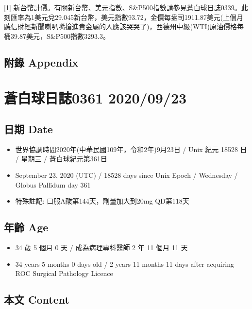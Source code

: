 \documentclass[
]{article}
\providecommand{\tightlist}{%
  \setlength{\itemsep}{0pt}\setlength{\parskip}{0pt}}
\begin{document}
{[}1{]}
新台幣計價。有關新台幣、美元指數、S\&P500指數請參見蒼白球日誌0339。此刻匯率為1美元兌29.045新台幣，美元指數93.72，金價每盎司1911.87美元(上個月聽信財經新聞喇叭嘴搶進貴金屬的人應該哭哭了)，西德州中級(WTI)原油價格每桶39.87美元，S\&P500指數3293.3。

\hypertarget{ux9644ux9304-appendix-21}{%
\subsection{附錄 Appendix}\label{ux9644ux9304-appendix-21}}

\hypertarget{ux84bcux767dux7403ux65e5ux8a8c0361-20200923}{%
\section{蒼白球日誌0361
2020/09/23}\label{ux84bcux767dux7403ux65e5ux8a8c0361-20200923}}

\hypertarget{ux65e5ux671f-date-22}{%
\subsection{日期 Date}\label{ux65e5ux671f-date-22}}

\begin{itemize}
\tightlist
\item
  世界協調時間2020年(中華民國109年，令和2年)9月23日 / Unix 紀元 18528 日
  / 星期三 / 蒼白球紀元第361日
\item
  September 23, 2020 (UTC) / 18528 days since Unix Epoch / Wednesday /
  Globus Pallidum day 361
\item
  特殊註記: 口服A酸第144天，劑量加大到20mg QD第118天
\end{itemize}

\hypertarget{ux5e74ux9f61-age-22}{%
\subsection{年齡 Age}\label{ux5e74ux9f61-age-22}}

\begin{itemize}
\tightlist
\item
  34 歲 5 個月 0 天 / 成為病理專科醫師 2 年 11 個月 11 天
\item
  34 years 5 months 0 days old / 2 years 11 months 11 days after
  acquiring ROC Surgical Pathology Licence
\end{itemize}

\hypertarget{ux672cux6587-content-22}{%
\subsection{本文 Content}\label{ux672cux6587-content-22}}
\end{document}
